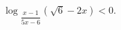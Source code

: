 \begin{ex}[type=inequality]
	\begin{condition}
		$ \log$\tiny$_{\dfrac{x - 1}{5x - 6}}$\normalsize$(\sqrt{6} - 2x)<0 .$
	\end{condition}
\end{ex}